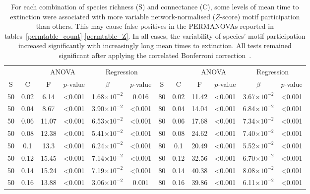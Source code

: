 \documentclass[12pt]{article}
\begin{document}
\begin{spacing}{2.0}
		\begin{table}[h!]
			\caption{For each combination of species richness (S) and connectance (C), some levels of mean time to extinction were associated with more variable network-normalised ($Z$-score) motif participation than others. This may cause false positives in the PERMANOVAs reported in tables~\ref{permtable_count}-\ref{permtable_Z}. In all cases, the variability of species' motif participation increased significantly with increasingly long mean times to extinction. All tests remained significant after applying the correlated Bonferroni correction~\citep{Drezner2016}.}
			\label{betadisp_Z}
			\footnotesize
			\begin{tabular}{c c | c c| c c ||c c | c c | c c |}
            &&\multicolumn{2}{c|}{ANOVA}&\multicolumn{2}{c||}{Regression}&&&\multicolumn{2}{c|}{ANOVA}&\multicolumn{2}{c|}{Regression}\\
            S&C&F&$p$-value&$\beta$&$p$-value&S&C&F&$p$-value&$\beta$&$p$-value\\
            \hline
            50  & 0.02  & 6.14  & \textless0.001  & 1.68$\times10^{-2}$ & 0.016 & 80  & 0.02  & 11.42 & \textless0.001  & 3.67$\times10^{-2}$ & \textless0.001  \\
            50  & 0.04  & 8.67  & \textless0.001  & 3.90$\times10^{-2}$ & \textless0.001  & 80  & 0.04  & 14.04 & \textless0.001  & 6.84$\times10^{-2}$ & \textless0.001  \\
            50  & 0.06  & 11.07 & \textless0.001  & 6.53$\times10^{-2}$ & \textless0.001  & 80  & 0.06  & 17.68 & \textless0.001  & 7.34$\times10^{-2}$ & \textless0.001  \\
            50  & 0.08  & 12.38 & \textless0.001  & 5.41$\times10^{-2}$ & \textless0.001  & 80  & 0.08  & 24.62 & \textless0.001  & 7.40$\times10^{-2}$ & \textless0.001  \\
            50  & 0.1 & 13.3  & \textless0.001  & 6.24$\times10^{-2}$ & \textless0.001  & 80  & 0.1 & 20.49 & \textless0.001  & 5.52$\times10^{-2}$ & \textless0.001  \\
            50  & 0.12  & 15.45 & \textless0.001  & 7.14$\times10^{-2}$ & \textless0.001  & 80  & 0.12  & 32.56 & \textless0.001  & 6.70$\times10^{-2}$ & \textless0.001  \\
            50  & 0.14  & 15.24 & \textless0.001  & 7.19$\times10^{-2}$ & \textless0.001  & 80  & 0.14  & 40.38 & \textless0.001  & 8.08$\times10^{-2}$ & \textless0.001  \\
            50  & 0.16  & 13.88 & \textless0.001  & 3.06$\times10^{-2}$ & 0.001 & 80  & 0.16  & 39.86 & \textless0.001  & 6.11$\times10^{-2}$ & \textless0.001  \\

\end{tabular}
\end{table}
\end{spacing}
\end{document}
